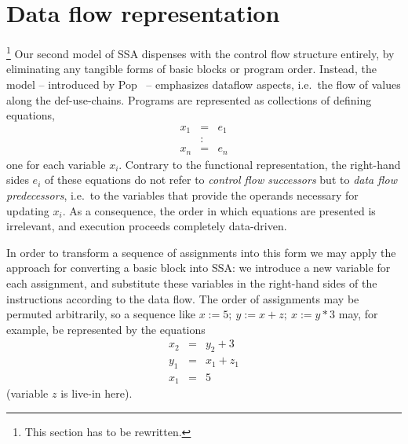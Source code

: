 
\section{Data flow representation}
\label{section:Part1:Semantics:PopSemantics}
\footnote{This section has to be rewritten.}
Our second model of SSA dispenses with the control flow structure
entirely, by eliminating any tangible forms of basic blocks or program
order. Instead, the model -- introduced by Pop~\cite{PopJS2007} --
emphasizes dataflow aspects, i.e.~the flow of values along the
def-use-chains.
Programs are represented as collections
of defining equations,
\begin{eqnarray*}
x_1 & = & e_1\\
& : &\\
x_n & = & e_n
\end{eqnarray*}
one for each variable $x_i$. Contrary to the functional
representation, the right-hand sides $e_i$ of these equations do not
refer to \emph{control flow successors} but to \emph{data flow
predecessors}, i.e.~to the variables that provide the operands
necessary for updating $x_i$. As a consequence, the order in which
equations are presented is irrelevant, and execution proceeds
completely data-driven.

In order to transform a sequence of assignments into this form we may
apply the approach for converting a basic block into SSA: we introduce
a new variable for each assignment, and substitute these variables in
the right-hand sides of the instructions according to the data
flow. The order of assignments may be permuted arbitrarily, so a
sequence like $x := 5;\ y:=x+z;\ x:=y*3$ may, for example, be
represented by the equations
\begin{eqnarray*}
x_2 & = & y_2 + 3\\
y_1 & = & x_1 + z_1\\
x_1 & = & 5
\end{eqnarray*}
(variable $z$ is live-in here).

